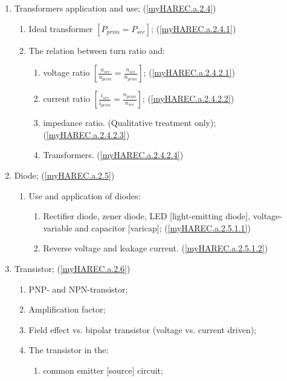 \begin{enumerate}
\begin{enumerate}[noitemsep]
\begin{enumerate}[noitemsep]
\end{enumerate}
\item Transformers application and use; (\ref{myHAREC.a.2.4})\label{HAREC.a.2.4}
\begin{enumerate}[noitemsep]
\item Ideal transformer $\left[P_{prim} = P_{sec}\right]$; (\ref{myHAREC.a.2.4.1})\label{HAREC.a.2.4.1}
\item The relation between turn ratio and:
\begin{enumerate}[noitemsep]
\item voltage ratio $\left[\frac{u_{sec}}{u_{prim}} = \frac{n_{sec}}{n_{prim}}\right]$; (\ref{myHAREC.a.2.4.2.1})\label{HAREC.a.2.4.2.1}
\item current ratio $\left[\frac{i_{sec}}{i_{prim}} = \frac{n_{prim}}{n_{sec}}\right]$; (\ref{myHAREC.a.2.4.2.2})\label{HAREC.a.2.4.2.2}
\item impedance ratio. (Qualitative treatment only); (\ref{myHAREC.a.2.4.2.3})\label{HAREC.a.2.4.2.3}
\item Transformers. (\ref{myHAREC.a.2.4.2.4})\label{HAREC.a.2.4.2.4}
\end{enumerate}
\end{enumerate}
\item Diode; (\ref{myHAREC.a.2.5})\label{HAREC.a.2.5}
\begin{enumerate}[noitemsep]
\item Use and application of diodes:
\begin{enumerate}[noitemsep]
	\item Rectifier diode, zener diode, LED [light-emitting diode], voltage-variable and capacitor [varicap]; (\ref{myHAREC.a.2.5.1.1})\label{HAREC.a.2.5.1.1}
	\item Reverse voltage and leakage current. (\ref{myHAREC.a.2.5.1.2})\label{HAREC.a.2.5.1.2}
\end{enumerate}
\end{enumerate}
\item Transistor; (\ref{myHAREC.a.2.6})\label{HAREC.a.2.6}
\begin{enumerate}[noitemsep]
\item PNP- and NPN-transistor;
\item Amplification factor;
\item Field effect vs. bipolar transistor (voltage vs. current driven);
\item The transistor in the:
\begin{enumerate}[noitemsep]
	\item common emitter [source] circuit;

\end{enumerate}
\end{enumerate}
\end{enumerate}
\end{enumerate}
